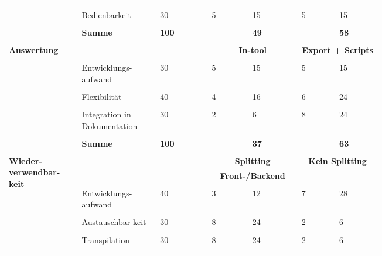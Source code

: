 \documentclass[main.tex]{subfiles} %
\begin{document}
\begin{table}[ht]
\begin{tabular}{|p{0.14\linewidth}|p{0.15\linewidth}|p{0.115\linewidth}|p{0.08\linewidth}|p{0.09\linewidth}|p{0.08\linewidth}|p{0.09\linewidth}|}
        &&&&&&\\[-9pt]
        & Bedienbarkeit & 30 & 5 & 15 & 5 & 15 \\[1pt]
        \cline{2-7}
        &&&&&&\\[-9pt]
        & \textbf{Summe} & \textbf{100} &  & \textbf{49} &  & \textbf{58} \\[1pt]
        \hline
        \hline
        & \multicolumn{2}{c|}{} & \multicolumn{2}{c|}{} & \multicolumn{2}{c|}{} \\[-9pt]
        \multirow{5}{4em}{\textbf{Auswertung}} & \multicolumn{2}{c|}{} & \multicolumn{2}{c|}{\textbf{In-tool}} & \multicolumn{2}{c|}{\textbf{Export + Scripts}} \\[1pt]
        \cline{2-7}
        &&&&&&\\[-9pt]
        & Entwicklungs-aufwand & 30 & 5 & 15 & 5 & 15 \\[1pt]
        \cline{2-7}
        &&&&&&\\[-9pt]
        & Flexibilität & 40 & 4 & 16 & 6 & 24 \\[1pt]
        \cline{2-7}
        &&&&&&\\[-9pt]
        & Integration in Dokumentation & 30 & 2 & 6 & 8 & 24 \\[1pt]
        \cline{2-7}
        &&&&&&\\[-9pt]
        & \textbf{Summe} & \textbf{100} &  & \textbf{37} &  & \textbf{63} \\[1pt]
        \hline
        \hline
        & \multicolumn{2}{c|}{} & \multicolumn{2}{c|}{} & \multicolumn{2}{c|}{} \\[-9pt]
        \multirow{6}{4em}{\textbf{Wieder-verwendbar-keit}} & \multicolumn{2}{c|}{} & \multicolumn{2}{c|}{\textbf{Splitting}} & \multicolumn{2}{c|}{\textbf{Kein Splitting}} \\[1pt]
        & \multicolumn{2}{c|}{} & \multicolumn{2}{c|}{\textbf{Front-/Backend}} & \multicolumn{2}{c|}{\textbf{}} \\[1pt]
        \cline{2-7}
        &&&&&&\\[-9pt]
        & Entwicklungs-aufwand & 40 & 3 & 12 & 7 & 28 \\[1pt]
        \cline{2-7}
        &&&&&&\\[-9pt]
        & Austauschbar-keit & 30 & 8 & 24 & 2 & 6 \\[1pt]
        \cline{2-7}
        &&&&&&\\[-9pt]
        & Transpilation & 30 & 8 & 24 & 2 & 6 \\[1pt]
        \cline{2-7}
        &&&&&&\\[-9pt]

\end{tabular}
\end{table}
\end{document}
